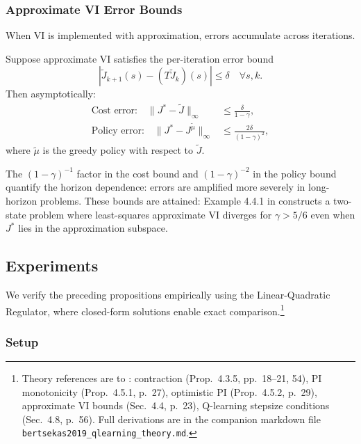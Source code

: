 \subsubsection{Approximate VI Error Bounds}

When VI is implemented with approximation, errors accumulate across iterations.

\begin{proposition}
\label{prop:approx_vi_bounds}
Suppose approximate VI satisfies the per-iteration error bound
\[
|\tilde{J}_{k+1}(s) - (T\tilde{J}_k)(s)| \leq \delta \quad \forall s, k.
\]
Then asymptotically:
\begin{align}
\text{Cost error:} \quad \|J^* - \tilde{J}\|_\infty &\leq \frac{\delta}{1-\gamma}, \\
\text{Policy error:} \quad \|J^* - J^{\tilde{\mu}}\|_\infty &\leq \frac{2\delta}{(1-\gamma)^2},
\end{align}
where $\tilde{\mu}$ is the greedy policy with respect to $\tilde{J}$.
\end{proposition}

The $(1-\gamma)^{-1}$ factor in the cost bound and $(1-\gamma)^{-2}$ in the policy bound quantify the horizon dependence: errors are amplified more severely in long-horizon problems. These bounds are attained: Example 4.4.1 in \citet{bertsekas2019} constructs a two-state problem where least-squares approximate VI diverges for $\gamma > 5/6$ even when $J^*$ lies in the approximation subspace.


\subsection{Experiments}
\label{sec:experiments}

We verify the preceding propositions empirically using the Linear-Quadratic Regulator, where closed-form solutions enable exact comparison.\footnote{Theory references are to \citet{bertsekas2019}: contraction (Prop.~4.3.5, pp.~18--21, 54), PI monotonicity (Prop.~4.5.1, p.~27), optimistic PI (Prop.~4.5.2, p.~29), approximate VI bounds (Sec.~4.4, p.~23), Q-learning stepsize conditions (Sec.~4.8, p.~56). Full derivations are in the companion markdown file \texttt{bertsekas2019\_qlearning\_theory.md}.}

\subsubsection{Setup}

